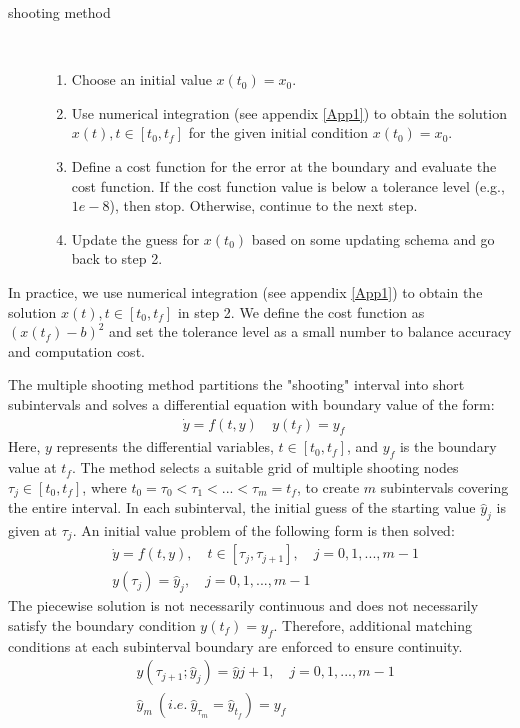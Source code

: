 \documentclass  [
  paper    = a4,
  BCOR     = 10mm,
  twoside,
  fontsize = 12pt,
  fleqn,
  toc      = bibnumbered,
  toc      = listofnumbered,
  numbers  = noendperiod,
  headings = normal,
  listof   = leveldown,
  version  = 3.03
]                                       {scrreprt}
\newcommand{\<}{\langle}
\renewcommand{\>}{\rangle}
\begin{document}
\begin{description}
	\item[shooting method] \
	\begin{enumerate}
		\item Choose an initial value $x(t_0)=x_0$.
		\item Use numerical integration (see appendix \ref{App1}) to obtain the solution $x(t), t \in [t_0, t_f]$ for the given initial condition $x(t_0)=x_0$.
		\item Define a cost function for the error at the boundary and evaluate the cost function. If the cost function value is below a tolerance level (e.g., $1e-8$), then stop. Otherwise, continue to the next step.
		\item Update the guess for $x(t_0)$ based on some updating schema and go back to step 2.
	\end{enumerate}
\end{description}
In practice, we use numerical integration (see appendix \ref{App1}) to obtain the solution $x(t), t \in [t_0, t_f]$ in step 2. We define the cost function as $(x(t_f)-b)^2$ and set the tolerance level as a small number to balance accuracy and computation cost.

The multiple shooting method partitions the "shooting" interval into short subintervals and solves a differential equation with boundary value of the form:
\begin{equation}\label{eqn:ori_dae}
	\begin{aligned}
		& \dot{y} = f(t, y) \
		& y(t_f) = y_f \
	\end{aligned}
\end{equation}
Here, $y$ represents the differential variables, $t \in [t_0, t_f]$, and $y_f$ is the boundary value at $t_f$. The method selects a suitable grid of multiple shooting nodes $\tau_j \in [t_0,t_f]$, where $t_0 = \tau_0 < \tau_1 < ... < \tau_m = t_f$, to create $m$ subintervals covering the entire interval. In each subinterval, the initial guess of the starting value $\hat{y}_j$ is given at $\tau_j$. An initial value problem of the following form is then solved:
\begin{equation}\label{eqn:msh}
	\begin{aligned}
		& \dot{y} = f(t, y), \quad t \in [\tau_j, \tau_{j+1}], \quad j = 0, 1, ..., m-1  \\
		& y(\tau_j) = \hat{y}_j, \quad j = 0, 1, ..., m-1 \
	\end{aligned}
\end{equation}
The piecewise solution is not necessarily continuous and does not necessarily satisfy the boundary condition $y(t_f) = y_f$. Therefore, additional matching conditions at each subinterval boundary are enforced to ensure continuity.
\begin{equation}\label{eqn:mc}
	\begin{aligned}
		& y(\tau_{j+1}; \hat{y}_j) = \hat{y}{j+1}, \quad j = 0, 1, ..., m-1 \\
		& \hat{y}_{m} \ (i.e. \ \hat{y}_{\tau_m} = \hat{y}_{t_f}) = y_f \
	\end{aligned}
\end{equation}
\end{document}
